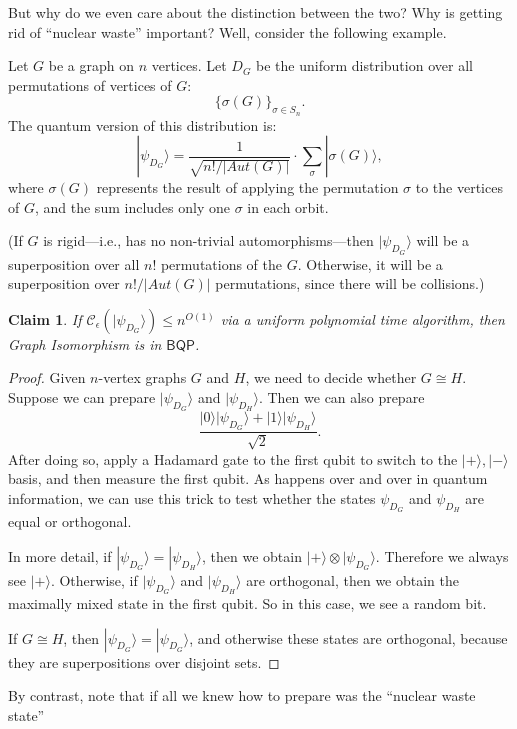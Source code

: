 \documentclass[12pt]{report}
\theoremstyle{plain}
\newtheorem{claim}[theorem]{Claim}
\theoremstyle{definition}
\renewcommand{\ket}[1]{|#1\rangle}
\newcommand{\tensor}{\otimes}
\newcommand{\sizee}{\ensuremath{\mathcal{C}_\epsilon}}
\begin{document}
But why do we even care about the distinction between the two?  Why is getting rid of ``nuclear waste'' important?  Well, consider the following example.

Let $G$ be a graph on $n$ vertices. Let $D_G$ be the uniform distribution over all permutations of vertices of $G$:
\[
\{\sigma(G)\}_{\sigma \in S_n}.
\]
The quantum version of this distribution is:
\[
\ket{\psi_{D_G}} = \frac{1}{\sqrt{n!/|Aut(G)|}} \cdot \sum_{\sigma} \ket{\sigma(G)},
\]
where $\sigma(G)$ represents the result of applying the permutation $\sigma$ to the vertices of $G$, and the sum includes only one $\sigma$ in each orbit.

(If $G$ is rigid---i.e., has no non-trivial automorphisms---then $\ket{\psi_{D_G}}$ will be a superposition over all $n!$ permutations of the $G$.  Otherwise, it will be a superposition over $n!/|Aut(G)|$ permutations, since there will be collisions.)

\begin{claim}
\label{gibqp}
If  $\sizee(\ket{\psi_{D_G}}) \leq n^{O(1)}$ via a uniform polynomial time algorithm, then Graph Isomorphism is in $\mathsf{BQP}$.
\end{claim}

\begin{proof}
Given $n$-vertex graphs $G$ and $H$, we need to decide whether $G \cong H$.  Suppose we can prepare $\ket{\psi_{D_G}}$ and $\ket{\psi_{D_H}}$.  Then we can also prepare
\[
\frac{\ket{0} \ket{\psi_{D_G}} + \ket{1} \ket{\psi_{D_H}}}{\sqrt{2}}.
\]
After doing so, apply a Hadamard gate to the first qubit to switch to the $\ket+, \ket-$ basis, and then measure the first qubit.  As happens over and over in quantum information, we can use this trick to test whether the states $\psi_{D_G}$ and $\psi_{D_H}$ are equal or orthogonal.

In more detail, if $\ket{\psi_{D_G}} = \ket{\psi_{D_H}}$, then we obtain $\ket+\tensor\ket{\psi_{D_G}}$. Therefore we always see $\ket+$. Otherwise, if $\ket{\psi_{D_G}}$ and $\ket{\psi_{D_H}}$ are orthogonal, then we obtain the maximally mixed state in the first qubit.  So in this case, we see a random bit.

If $G \cong H$, then $\ket{\psi_{D_G}}=\ket{\psi_{D_G}}$, and otherwise these states are orthogonal, because they are superpositions over disjoint sets.
\end{proof}

By contrast, note that if all we knew how to prepare was the ``nuclear waste state''
\end{document}
